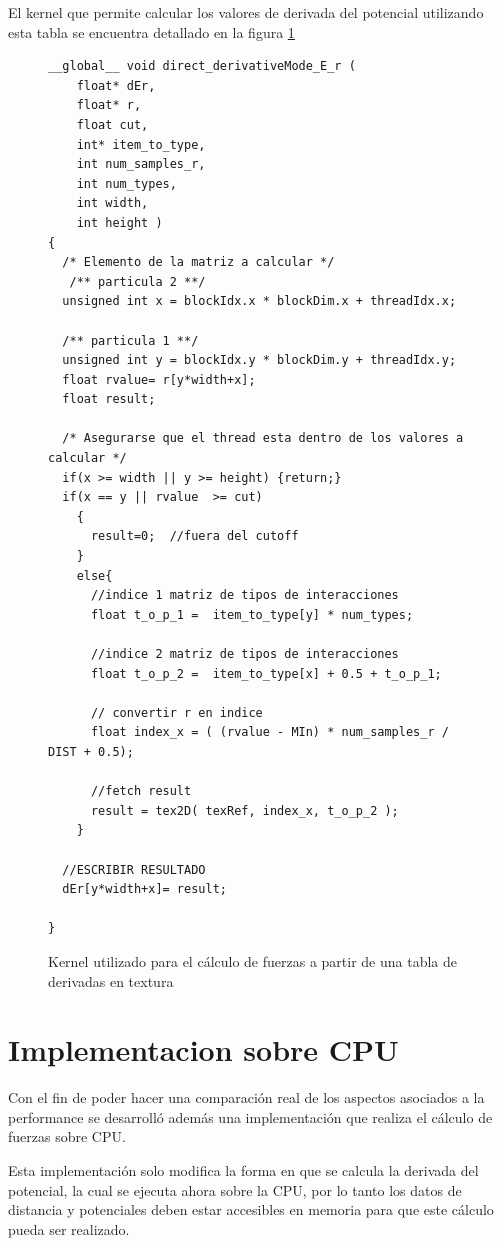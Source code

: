 El kernel que permite calcular los valores de derivada del potencial utilizando esta tabla se encuentra detallado en la figura \ref{code:derivativesKernel}

\begin{figure}[htbp]
    \begin{lstlisting}
__global__ void direct_derivativeMode_E_r (
    float* dEr,
    float* r, 
    float cut, 
    int* item_to_type, 
    int num_samples_r, 
    int num_types, 
    int width, 
    int height )
{ 
  /* Elemento de la matriz a calcular */
   /** particula 2 **/
  unsigned int x = blockIdx.x * blockDim.x + threadIdx.x;
  
  /** particula 1 **/
  unsigned int y = blockIdx.y * blockDim.y + threadIdx.y;	
  float rvalue= r[y*width+x]; 
  float result;
  
  /* Asegurarse que el thread esta dentro de los valores a calcular */
  if(x >= width || y >= height) {return;}
  if(x == y || rvalue  >= cut) 
    {
      result=0;  //fuera del cutoff
    }
    else{
      //indice 1 matriz de tipos de interacciones
      float t_o_p_1 =  item_to_type[y] * num_types;	
      
      //indice 2 matriz de tipos de interacciones
      float t_o_p_2 =  item_to_type[x] + 0.5 + t_o_p_1;	
      
      // convertir r en indice
      float index_x = ( (rvalue - MIn) * num_samples_r / DIST + 0.5);	
     
      //fetch result
      result = tex2D( texRef, index_x, t_o_p_2 );
    }
   
  //ESCRIBIR RESULTADO 
  dEr[y*width+x]= result;

}
    \end{lstlisting}
    \caption{Kernel utilizado para el cálculo de fuerzas a partir de una tabla de derivadas en textura}
    \label{code:derivativesKernel}
\end{figure}



\section{Implementacion sobre CPU}

Con el fin de poder hacer una comparación real de los aspectos asociados a la performance se desarrolló además una implementación que realiza el cálculo de fuerzas sobre CPU.

Esta implementación solo modifica la forma en que se calcula la derivada del potencial, la cual se ejecuta ahora sobre la CPU, por lo tanto los datos de distancia y potenciales deben estar accesibles en memoria para que este cálculo pueda ser realizado.
